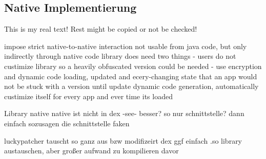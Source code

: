 \subsection{Native Implementierung} \label{subsection:counter-modifications-dynamic}
This is my real text! Rest might be copied or not be checked!

%
impose strict native-to-native interaction
not usable from java code, but only indirectly through native code library
does need two things
- users do not custimize library so a heavily obfuscated version could be needed
- use encryption and dynamic code loading, updated and ecery-changing state that an app would not be stuck with a version until update
dynamic code generation, automatically custimize itself for every app and ever time its loaded
\cite{munteanLicense}
%

Library native\newline
native ist nicht in dex -see- besser?\newline
so nur schnittstelle? dann einfach sozusagen die schnittstelle faken\newline

luckypatcher tauscht so ganz aus bzw modifizeirt dex\newline
ggf einfach .so library austauschen, aber großer aufwand zu kompilieren davor\newline
